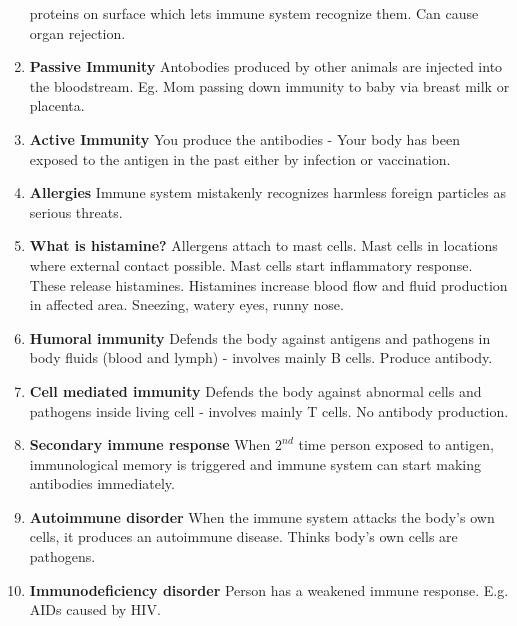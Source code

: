 \documentclass[9pt]{article}
\begin{document}
\begin{enumerate}
    proteins on surface which lets immune system recognize them. Can
    cause organ rejection.
  \item {\bf Passive Immunity} Antobodies produced by other animals
    are injected into the bloodstream. Eg. Mom passing down immunity
    to baby via breast milk or placenta.
  \item {\bf Active Immunity} You produce the antibodies - Your body
    has been exposed to the antigen in the past either by infection or
    vaccination.
  \item {\bf Allergies} Immune system mistakenly recognizes harmless
    foreign particles as serious threats.
  \item {\bf What is histamine?}  Allergens attach to mast cells. Mast
    cells in locations where external contact possible. Mast cells
    start inflammatory response. These release histamines. Histamines
    increase blood flow and fluid production in affected
    area. Sneezing, watery eyes, runny nose.
  \item {\bf Humoral immunity} Defends the body against antigens and
    pathogens in body fluids (blood and lymph) - involves mainly B
    cells. Produce antibody.
  \item {\bf Cell mediated immunity} Defends the body against abnormal
    cells and pathogens inside living cell - involves mainly T
    cells. No antibody production.
  \item {\bf Secondary immune response} When $2^{nd}$ time person
    exposed to antigen, immunological memory is triggered and immune
    system can start making antibodies immediately.
  \item {\bf Autoimmune disorder} When the immune system attacks the
    body's own cells, it produces an autoimmune disease. Thinks body's
    own cells are pathogens.
  \item {\bf Immunodeficiency disorder} Person has a weakened immune
    response. E.g. AIDs caused by HIV.
\end{enumerate}
\end{document}
